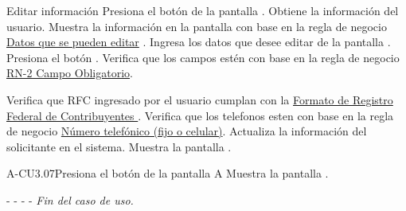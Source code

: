 	\begin{UCtrayectoria}{Editar información }
        \UCpaso[\UCactor]Presiona el botón  de la pantalla .
        \UCpaso[\UCsist] Obtiene la información del usuario.
		\UCpaso[\UCsist] Muestra la información en la pantalla   con base en la regla de negocio \hyperlink{RN11}{Datos que se pueden editar} . 
		\UCpaso[\UCactor] Ingresa los datos que desee editar de la pantalla .
		\UCpaso[\UCactor] Presiona el botón . 
		\UCpaso[\UCsist] Verifica que los campos estén con base en la regla de negocio \hyperlink{RN2}{RN-2 Campo Obligatorio}. 

	    \UCpaso[\UCsist] Verifica que RFC ingresado por el usuario cumplan con la \hyperlink{RN8}{Formato de Registro Federal de Contribuyentes } . 
	    \UCpaso[\UCsist] Verifica que los telefonos esten con base en la regla de negocio \hyperlink{RN10}{Número telefónico (fijo o celular)}. 
        \UCpaso[\UCsist] Actualiza la información del solicitante en el sistema.
	    \UCpaso[\UCsist] Muestra la pantalla .
	
	\end{UCtrayectoria}
	

	

	
	

	\begin{UCtrayectoriaA}{A-CU3.07}{Presiona el botón  de la pantalla }{A}
		\UCpaso[\UCsist] Muestra la pantalla .
		\item[- -] - - {\em Fin del caso de uso.} 
	\end{UCtrayectoriaA}

